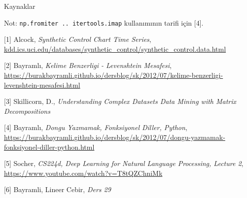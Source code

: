 \documentclass[12pt,fleqn]{article}\usepackage{../../common}
\begin{document}
Kaynaklar

Not: \verb!np.fromiter .. itertools.imap! kullanımının tarifi için [4].

[1] Alcock, {\em Synthetic Control Chart Time Series}, \url{kdd.ics.uci.edu/databases/synthetic_control/synthetic_control.data.html}

[2] Bayramlı, 
    {\em Kelime Benzerligi - Levenshtein Mesafesi}, 
    \url{https://burakbayramli.github.io/dersblog/sk/2012/07/kelime-benzerligi-levenshtein-mesafesi.html}

[3] Skillicorn, D., {\em Understanding Complex Datasets Data Mining with Matrix Decompositions}

[4] Bayramlı, 
    {\em Dongu Yazmamak, Fonksiyonel Diller, Python}, 
    \url{https://burakbayramli.github.io/dersblog/sk/2012/07/dongu-yazmamak-fonksiyonel-diller-python.html}

[5] Socher, {\em CS224d, Deep Learning for Natural Language Processing,
  Lecture 2}, \url{https://www.youtube.com/watch?v=T8tQZChniMk}

[6] Bayramli, Lineer Cebir, {\em Ders 29}
\end{document}
